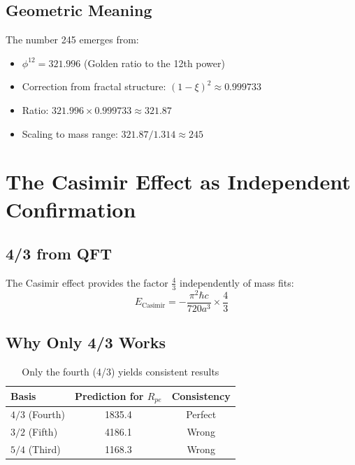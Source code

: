 	\subsection{Geometric Meaning}
	
	The number 245 emerges from:
	\begin{itemize}
		\item $\phi^{12} = 321.996$ (Golden ratio to the 12th power)
		\item Correction from fractal structure: $(1 - \xi)^2 \approx 0.999733$
		\item Ratio: $321.996 \times 0.999733 \approx 321.87$
		\item Scaling to mass range: $321.87/1.314 \approx 245$
	\end{itemize}
	
	\section{The Casimir Effect as Independent Confirmation}
	
	\subsection{4/3 from QFT}
	
	The Casimir effect provides the factor $\frac{4}{3}$ independently of mass fits:
	\begin{equation}
		E_{\text{Casimir}} = -\frac{\pi^2 \hbar c}{720 a^3} \times \frac{4}{3}
	\end{equation}
	
	\subsection{Why Only 4/3 Works}
	
	\begin{table}[htbp]
		\centering
		\begin{tabular}{lcc}
			\toprule
			\textbf{Basis} & \textbf{Prediction for $R_{pe}$} & \textbf{Consistency} \\
			\midrule
			$4/3$ (Fourth) & 1835.4 & \checkmark Perfect \\
			$3/2$ (Fifth) & 4186.1 & \texttimes Wrong \\
			$5/4$ (Third) & 1168.3 & \texttimes Wrong \\
			\bottomrule
		\end{tabular}
		\caption{Only the fourth (4/3) yields consistent results}
	\end{table}
	
